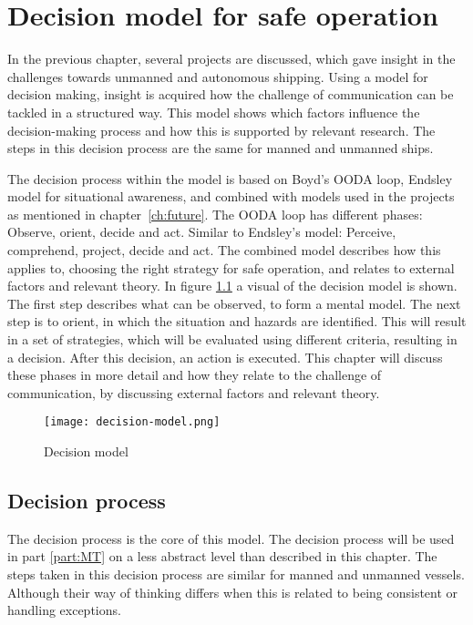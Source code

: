 \chapter{Decision model for safe operation}
\label{ch:model}
In the previous chapter, several projects are discussed, which gave insight in the challenges towards unmanned and autonomous shipping. Using a model for decision making, insight is acquired how the challenge of communication can be tackled in a structured way. This model shows which factors influence the decision-making process and how this is supported by relevant research. The steps in this decision process are the same for manned and unmanned ships.

The decision process within the model is based on Boyd's OODA loop, Endsley model for situational awareness, and combined with models used in the projects as mentioned in chapter~\ref{ch:future}. 
The OODA loop has different phases: Observe, orient, decide and act. Similar to Endsley's model: Perceive, comprehend, project, decide and act. 
The combined model describes how this applies to, choosing the right strategy for safe operation, and relates to external factors and relevant theory. In figure \ref{fig:decision-model} a visual of the decision model is shown. The first step describes what can be observed, to form a mental model. The next step is to orient, in which the situation and hazards are identified. This will result in a set of strategies, which will be evaluated using different criteria, resulting in a decision. After this decision, an action is executed. This chapter will discuss these phases in more detail and how they relate to the challenge of communication, by discussing external factors and relevant theory.

\begin{figure}[p]
	\centering
	\texttt{[image: decision-model.png]}
	\caption{Decision model}
	\label{fig:decision-model}
\end{figure}

\section{Decision process}
The decision process is the core of this model. The decision process will be used in part \ref{part:MT} on a less abstract level than described in this chapter. The steps taken in this decision process are similar for manned and unmanned vessels. Although their way of thinking differs when this is related to being consistent or handling exceptions.

